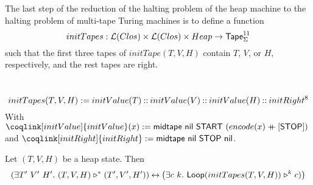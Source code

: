 The last step of the reduction of the halting problem of the heap machine to the halting problem of multi-tape Turing machines is to define a function
\[
  initTapes : \mathcal{L}(Clos) \times \mathcal{L}(Clos) \times Heap \rightarrow \mathsf{Tape}_\Sigma^{11}
\]
such that the first three tapes of $initTape(T,V,H)$ contain $T$, $V$, or $H$, respectively, and the rest tapes are right.

\begin{definition}[$initTapes$][initTapes]
  \label{def:initTapes}
  ~
  \[
    initTapes(T,V,H) := initValue(T) \mathbin{::} initValue(V) \mathbin{::} initValue(H) \mathbin{::} initRight^8
  \]
  With $\coqlink[initValue]{initValue}(x) := \MS{midtape}~\nil~\MS{START}~(encode(x) \app [\MS{STOP}])$ and
  $\coqlink[initRight]{initRight} := \MS{midtape}~\nil~\MS{STOP}~\nil$.  %
\end{definition}

\begin{theorem}
  \label{lem:HaltingProblem}
  Let $(T,V,H)$ be a heap state.  Then
  \[
    \left(\exists T'~V'~H'.~(T,V,H) \mathrel{\triangleright}^* (T',V',H') \right) \mathbin{\leftrightarrow} \left(\exists c~k.~\mathsf{Loop}(initTapes(T,V,H)) \mathrel{\triangleright}^k c)\right)
  \]
\end{theorem}







